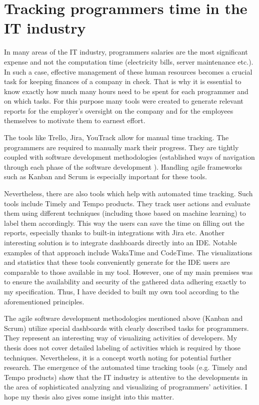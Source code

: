 \section{Tracking programmers time in the IT industry}

In many areas of the IT industry, programmers salaries are the most significant expense
and not the computation time (electricity bills, server maintenance etc.). In such a case, effective management of these human resources becomes a crucial task for keeping finances of a company in check. That is why it is essential to know exactly how much many hours need to be spent for each programmer and on which tasks. For this purpose many tools were created to generate relevant reports for the employer's oversight on the company and for the employees themselves to motivate them to earnest effort.

The tools like Trello, Jira, YouTrack allow for manual time tracking. The programmers are required to manually mark their progress. They are tightly coupled with software development methodologies (established ways of navigation through each phase of the software development \cite{Con92SDM}). Handling agile frameworks such as Kanban and Scrum is especially important for these tools.

Nevertheless, there are also tools which help with automated time tracking. Such tools include Timely and Tempo products. They track user actions and evaluate them using different techniques (including those based on machine learning) to label them accordingly. This way the users can save the time on filling out the reports, especially thanks to built-in integrations with Jira etc. Another interesting solution is to integrate dashboards directly into an IDE. Notable examples of that approach include WakaTime and CodeTime. The visualizations and statistics that these tools conveniently generate for the IDE users are comparable to those available in my tool. However, one of my main premises was to ensure the availability and security of the gathered data adhering exactly to my specification. Thus, I have decided to built my own tool according to the aforementioned principles.

The agile software development methodologies mentioned above (Kanban and Scrum) utilize special dashboards with clearly described tasks for programmers. They represent an interesting way of visualizing activities of developers. My thesis does not cover detailed labeling of activities which is required by those techniques. Nevertheless, it is a concept worth noting for potential further research. The emergence of the automated time tracking tools (e.g. Timely and Tempo products) show that the IT industry is attentive to the developments in the area of sophisticated analyzing and visualizing of programmers' activities. I hope my thesis also gives some insight into this matter.

